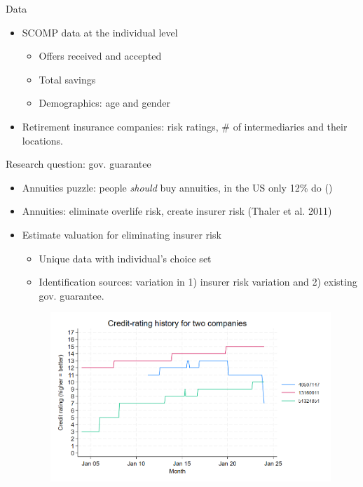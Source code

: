 \documentclass[10pt,aspectratio=169]{beamer}
\begin{document}

 \begin{frame}{Data}
\begin{itemize}
    \item SCOMP data at the individual level  
    \begin{itemize}
        \item Offers received and accepted 
        \item Total savings 
        \item Demographics: age and gender
    \end{itemize}
     \item Retirement insurance companies: risk ratings, \#  of intermediaries and their  locations.
\end{itemize}


\end{frame}



\begin{frame}{Research question: gov. guarantee}
\begin{itemize}
    \item Annuities puzzle: people \textit{should} buy annuities, in the US only 12\% do (\cite{modigliani_life_1986})

    \item Annuities: eliminate overlife risk, create insurer risk (Thaler et al. 2011) %

    \item Estimate valuation for eliminating insurer risk
    \begin{itemize}
        \item Unique data with individual's choice set 
        \item Identification sources: variation in 1) insurer risk variation and 2) existing gov. guarantee.  
\end{itemize}

\begin{figure}
    \centering
    \includegraphics[width=0.5\linewidth]{../figures/credit_history.png}
    \label{fig:enter-label}
\end{figure}

  \end{itemize}
 
\end{frame}
\end{document}
